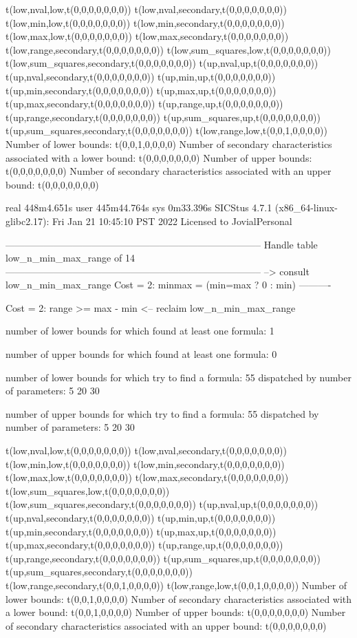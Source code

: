 t(low,nval,low,t(0,0,0,0,0,0,0))
t(low,nval,secondary,t(0,0,0,0,0,0,0))
t(low,min,low,t(0,0,0,0,0,0,0))
t(low,min,secondary,t(0,0,0,0,0,0,0))
t(low,max,low,t(0,0,0,0,0,0,0))
t(low,max,secondary,t(0,0,0,0,0,0,0))
t(low,range,secondary,t(0,0,0,0,0,0,0))
t(low,sum_squares,low,t(0,0,0,0,0,0,0))
t(low,sum_squares,secondary,t(0,0,0,0,0,0,0))
t(up,nval,up,t(0,0,0,0,0,0,0))
t(up,nval,secondary,t(0,0,0,0,0,0,0))
t(up,min,up,t(0,0,0,0,0,0,0))
t(up,min,secondary,t(0,0,0,0,0,0,0))
t(up,max,up,t(0,0,0,0,0,0,0))
t(up,max,secondary,t(0,0,0,0,0,0,0))
t(up,range,up,t(0,0,0,0,0,0,0))
t(up,range,secondary,t(0,0,0,0,0,0,0))
t(up,sum_squares,up,t(0,0,0,0,0,0,0))
t(up,sum_squares,secondary,t(0,0,0,0,0,0,0))
t(low,range,low,t(0,0,1,0,0,0,0))
Number of lower bounds:                                             t(0,0,1,0,0,0,0)
Number of secondary characteristics associated with a lower bound:  t(0,0,0,0,0,0,0)
Number of upper bounds:                                             t(0,0,0,0,0,0,0)
Number of secondary characteristics associated with an upper bound: t(0,0,0,0,0,0,0)

real	448m4.651s
user	445m44.764s
sys	0m33.396s
SICStus 4.7.1 (x86_64-linux-glibc2.17): Fri Jan 21 10:45:10 PST 2022
Licensed to JovialPersonal


--------------------------------------------------------------------------------
Handle table low_n_min_max_range of 14
--------------------------------------------------------------------------------
--> consult low_n_min_max_range
Cost =  2:  minmax = (min=max ? 0 : min)
----------

Cost =  2:  range >= max - min
<-- reclaim low_n_min_max_range

number of lower bounds for which found at least one formula: 1

number of upper bounds for which found at least one formula: 0

number of lower bounds for which try to find a formula: 55
dispatched by number of parameters: 5  20  30

number of upper bounds for which try to find a formula: 55
dispatched by number of parameters: 5  20  30

t(low,nval,low,t(0,0,0,0,0,0,0))
t(low,nval,secondary,t(0,0,0,0,0,0,0))
t(low,min,low,t(0,0,0,0,0,0,0))
t(low,min,secondary,t(0,0,0,0,0,0,0))
t(low,max,low,t(0,0,0,0,0,0,0))
t(low,max,secondary,t(0,0,0,0,0,0,0))
t(low,sum_squares,low,t(0,0,0,0,0,0,0))
t(low,sum_squares,secondary,t(0,0,0,0,0,0,0))
t(up,nval,up,t(0,0,0,0,0,0,0))
t(up,nval,secondary,t(0,0,0,0,0,0,0))
t(up,min,up,t(0,0,0,0,0,0,0))
t(up,min,secondary,t(0,0,0,0,0,0,0))
t(up,max,up,t(0,0,0,0,0,0,0))
t(up,max,secondary,t(0,0,0,0,0,0,0))
t(up,range,up,t(0,0,0,0,0,0,0))
t(up,range,secondary,t(0,0,0,0,0,0,0))
t(up,sum_squares,up,t(0,0,0,0,0,0,0))
t(up,sum_squares,secondary,t(0,0,0,0,0,0,0))
t(low,range,secondary,t(0,0,1,0,0,0,0))
t(low,range,low,t(0,0,1,0,0,0,0))
Number of lower bounds:                                             t(0,0,1,0,0,0,0)
Number of secondary characteristics associated with a lower bound:  t(0,0,1,0,0,0,0)
Number of upper bounds:                                             t(0,0,0,0,0,0,0)
Number of secondary characteristics associated with an upper bound: t(0,0,0,0,0,0,0)

